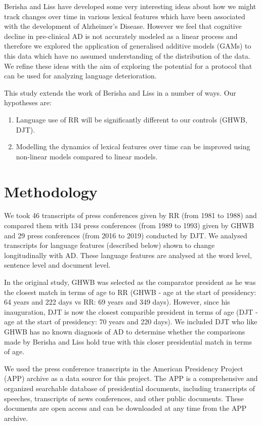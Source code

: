 \documentclass[10pt, letterpaper, twoside, openany]{thesis}
\begin{document}
\par   
Berisha and Liss have developed some very interesting ideas about how we might track changes over time in various lexical features which have been associated with the development of Alzheimer's Disease. However we feel that cognitive decline in pre-clinical AD is not accurately modeled as a linear process and therefore we explored the application of generalised additive models (GAMs) to this data which have no assumed understanding of the distribution of the data. We refine these ideas with the aim of exploring the potential for a protocol that can be used for analyzing language deterioration. 


This study extends the work of Berisha and Liss in a number of ways. Our hypotheses are:
\begin{enumerate}
	\item Language use of RR will be significantly different to our controls (GHWB, DJT).
	\item Modelling the dynamics of lexical features over time can be improved using non-linear models compared to linear models.
\end{enumerate}

\section{Methodology}\label{methodology}
We took 46 transcripts of press conferences given by RR (from 1981 to 1988) and compared them with 134 press conferences (from 1989 to 1993) given by GHWB and 29 press conferences (from 2016 to 2019) conducted by DJT.  We analysed transcripts for language features (described below) shown to change longitudinally with AD. These language features are analysed at the word level, sentence level and document level. 
\par 
In the original study, GHWB was selected as the comparator president as he was the closest match in terms of age to RR (GHWB - age at the start of presidency: 64 years and 222 days vs RR: 69 years and 349 days). However, since his inauguration, DJT is now the closest comparible president in terms of age (DJT - age at the start of presidency: 70 years and 220 days). We included DJT who like GHWB has no known diagnosis of AD to determine whether the comparisons made by Berisha and Liss hold true with this closer presidential match in terms of age. 
\par 
We used the press conference transcripts in the American Presidency Project (APP) archive as a data source for this project. The APP is a comprehensive and organized searchable database of presidential documents, including transcripts of speeches, transcripts of news conferences, and other public documents. These documents are open access and can be downloaded at any time from the APP archive.
\end{document}
